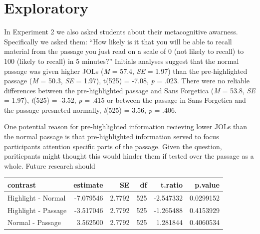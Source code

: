 \documentclass[doc]{apa6}
\begin{document}
\hypertarget{exploratory}{%
\section{Exploratory}\label{exploratory}}

In Experiment 2 we also asked students about their metacognitive awarness. Specifically we asked them: \enquote{How likely is it that you will be able to recall material from the passage you just read on a scale of 0 (not likely to recall) to 100 (likely to recall) in 5 minutes?} Initials analyses suggest that the normal passage was given higher JOLs (\emph{M} = 57.4, \emph{SE} = 1.97) than the pre-highlighted passage (\emph{M} = 50.3, \emph{SE} = 1.97), t(525) = -7.08, \emph{p} = .023. There were no reliable differences between the pre-highlighted passage and Sans Forgetica (\emph{M} = 53.8, \emph{SE} = 1.97), \emph{t}(525) = -3.52, \emph{p} = .415 or between the passage in Sans Forgetica and the passage presneted normally, \emph{t}(525) = 3.56, \emph{p} = .406.

One potential reason for pre-highlighted information recieving lower JOLs than the normal passage is that pre-highlighted information served to focus participants attention specific parts of the passage. Given the question, pariticpants might thought this would hinder them if tested over the passage as a whole. Future research should

\begin{tabular}{l|r|r|r|r|r}
\hline
contrast & estimate & SE & df & t.ratio & p.value\\
\hline
Highlight - Normal & -7.079546 & 2.7792 & 525 & -2.547332 & 0.0299152\\
\hline
Highlight - Passage & -3.517046 & 2.7792 & 525 & -1.265488 & 0.4153929\\
\hline
Normal - Passage & 3.562500 & 2.7792 & 525 & 1.281844 & 0.4060534\\
\hline
\end{tabular}
\end{document}
